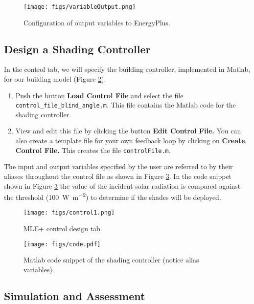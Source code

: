 \documentclass[11pt]{article}
\begin{document}
\begin{figure}[htb]
\centering
\texttt{[image: figs/variableOutput.png]}
\caption{\label{fig:output}Configuration of output variables to EnergyPlus.}
\end{figure}



\subsection{Design a Shading Controller}
\label{sec-4-5}

In the control tab, we will specify
the building controller, implemented in Matlab, for our building model (Figure \ref{fig:control1}).
\begin{enumerate}
\item Push the button \textbf{Load Control File} and select the file
\texttt{control\_file\_blind\_angle.m}.  This file contains the Matlab code
for the shading controller.
\item View and edit this file by clicking the button \textbf{Edit Control File.}
You can also create a template file for your own feedback loop by clicking 
on \textbf{Create Control File.} This creates the file \texttt{controlFile.m}.
\end{enumerate}


The input and output variables specified by the user are referred to
by their aliases throughout the control file as shown in Figure
\ref{fig:code}.  In the code snippet shown in Figure \ref{fig:code}
the value of the incident solar radiation is compared against the
threshold (\SI{100}{\watt\per\meter\squared}) to determine if the
shades will be deployed.


\begin{figure}[htb]
\centering
\texttt{[image: figs/control1.png]}
\caption{\label{fig:control1}MLE+ control design tab.}
\end{figure}


\begin{figure}[htb]
\centering
\texttt{[image: figs/code.pdf]}
\caption{\label{fig:code}Matlab code snippet of the shading controller (notice alias variables).}
\end{figure}



\subsection{Simulation and Assessment}
\label{sec-4-6}
\end{document}
